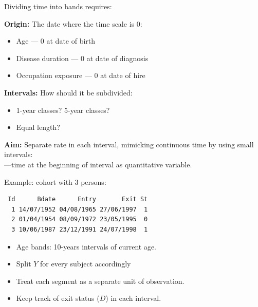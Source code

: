\begin{frame}{Dividing time into bands requires:}


\pause
\textbf{Origin:} The date where the time scale is $0$: \pause
  \begin{itemize}
  \item Age --- $0$ at date of birth
  \item Disease duration --- $0$ at date of diagnosis
  \item Occupation exposure --- $0$ at date of hire
  \end{itemize}

\pause
\textbf{Intervals:} How should it be subdivided:
 \begin{itemize}
  \item 1-year classes? 5-year classes?
  \item Equal length?
  \end{itemize}

\pause
\textbf{Aim:} Separate rate in each interval, mimicking continuous
time by using small intervals:\\---time at the beginning of interval as
quantitative variable.

\end{frame}

\begin{frame}[fragile]{Example: cohort with 3 persons:}
\small
\renewcommand{\baselinestretch}{0.9}
\begin{verbatim}
 Id      Bdate      Entry       Exit St
  1 14/07/1952 04/08/1965 27/06/1997  1
  2 01/04/1954 08/09/1972 23/05/1995  0
  3 10/06/1987 23/12/1991 24/07/1998  1
\end{verbatim}
\renewcommand{\baselinestretch}{1.0}
\normalsize
\pause
\vspace*{-1ex}
\begin{itemize}[<+->]
\item Age bands: 10-years intervals of current age.
\item Split $Y$ for every subject accordingly
\item Treat each segment as a separate unit of observation.
\item Keep track of exit status ($D$) in each interval.
\end{itemize}

\end{frame}

